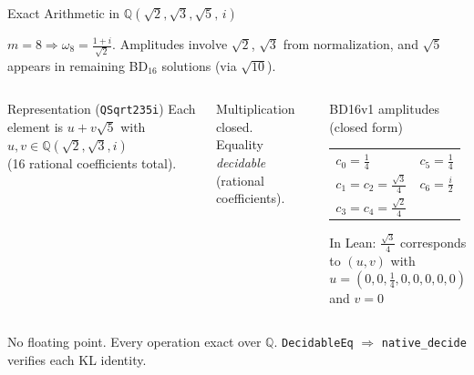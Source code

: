 \documentclass[aspectratio=169,t,10pt]{beamer}
\newcommand{\QQ}{\mathbb{Q}}
\newcommand{\code}[1]{\texttt{\small #1}}
\newcommand{\chk}{\textcolor{Sage}{\checkmark}}
\begin{document}
\begin{frame}{Exact Arithmetic in $\QQ(\sqrt{2},\sqrt{3},\sqrt{5},\,i)$}

$m{=}8 \Rightarrow \omega_8 = \tfrac{1+i}{\sqrt{2}}$.\;
Amplitudes involve $\sqrt{2}$, $\sqrt{3}$ from normalization,
and $\sqrt{5}$ appears in remaining BD$_{16}$ solutions (via $\sqrt{10}$).

\begin{columns}[T]
\begin{block}{Representation (\code{QSqrt235i})}
Each element is $u + v\sqrt{5}$ with $u,v \in \QQ(\sqrt{2},\sqrt{3},i)$\\
(16 rational coefficients total).
\end{block}

Multiplication closed.\\
Equality \emph{decidable} (rational coefficients).

\begin{exampleblock}{BD16v1 amplitudes (closed form)}
{\small
\begin{tabular}{@{}ll@{}}
$c_0 {=} \tfrac{1}{4}$ & $c_5 {=} \tfrac{1}{4}$\\[2pt]
$c_1 {=} c_2 {=} \tfrac{\sqrt{3}}{4}$ & $c_6 {=} \tfrac{i}{2}$\\[2pt]
$c_3 {=} c_4 {=} \tfrac{\sqrt{2}}{4}$\\
\end{tabular}
}

In Lean: $\tfrac{\sqrt{3}}{4}$ corresponds to $(u,v)$ with\\
$u=(0,0,\tfrac{1}{4},0,0,0,0,0)$ and $v=0$\;\chk
\end{exampleblock}
\end{columns}

\vspace{0.2em}
\textcolor{Slate}{\small No floating point.  Every operation exact over $\QQ$.
\code{DecidableEq} $\Rightarrow$ \code{native\_decide} verifies each KL identity.}
\end{frame}
\end{document}
